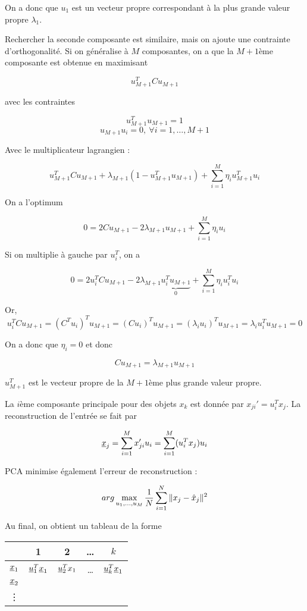 	On a donc que $u_1$ est un vecteur propre correspondant à la plus grande valeur propre $\lambda_1$.
	
	
	Rechercher la seconde composante est similaire, mais on ajoute une contrainte d'orthogonalité. Si on généralise à $M$ composantes, on a que la $M + 1$ème composante est obtenue en maximisant 
	
	$$u_{M + 1}^T C u_{M + 1}$$
	
	avec les contraintes
	
	$$u_{M + 1}^T u_{M + 1} = 1$$
	$$u_{M + 1} u_i = 0, \: \forall i = 1, \dots , M + 1$$
	
	Avec le multiplicateur lagrangien :
	
	$$u_{M + 1}^T Cu_{M + 1} + \lambda_{M + 1} (1 - u_{M + 1}^T u_{M + 1}) + \sum_{i = 1}^M \eta_i u_{M + 1}^T u_i$$
	
	On a l'optimum
	
	$$0 = 2 C u_{M + 1} - 2 \lambda_{M + 1} u_{M + 1}  +\sum_{i=1}^M \eta_i u_i$$
	
	Si on multiplie à gauche par $u_i^T$, on a
	
	$$0 = 2u_i^T C u_{M + 1} - 2 \lambda_{M + 1} \underbrace{u_i^T u_{M + 1}}_{0}  +\sum_{i=1}^M \eta_i u_i^T u_i$$
	
	Or, 
	$$u_i^TCu_{M + 1} = (C^Tu_i)^Tu_{M + 1} = (Cu_i)^T u_{M + 1} = (\lambda_i u_i)^T u_{M + 1} = \lambda_i u_i^T u_{M + 1} = 0$$
	
	On a donc que $\eta_i = 0$ et donc
	
	$$C u_{M + 1} = \lambda_{M + 1} u_{M + 1}$$
	
	$u_{M + 1}^T$ est le vecteur propre de la $M + 1$ème plus grande valeur propre.
	
	La $i$ème composante principale pour des objets $x_k$ est donnée par $x_{ji}' = u_i^Tx_j$. La reconstruction de l'entrée se fait par
	
	$$\underline{x}_j = \sum_{i = 1}^M x_{ji}' u_i = \sum_{i = 1}^M(u_i^Tx_j)u_i$$
	
	PCA minimise également l'erreur de reconstruction :
	
	$$arg \max_{u_1, \dots , u_M} \frac{1}{N} \sum_{i = 1}^N \Vert x_j - \hat{x}_j \Vert^2$$
	
	
	Au final, on obtient un tableau de la forme
	
	\begin{center}
	\begin{tabular}{c|cccc}
	\hline 
	  & 1 & 2 & \dots & $k$ \\ 
	\hline 
	$\underline{x}_1$ & $\underline{u}_1^T\underline{x}_1$ & $\underline{u}_2^Tx_1$ & \dots & $\underline{u}_k^T\underline{x}_1$ \\ 
	$\underline{x}_2$ &   &   &   &   \\ 
	\vdots &   &   &   &   \\ 
	\end{tabular} 
	\end{center}
	

